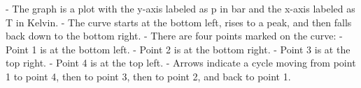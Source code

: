 - The graph is a plot with the y-axis labeled as p in bar and the x-axis labeled as T in Kelvin.
- The curve starts at the bottom left, rises to a peak, and then falls back down to the bottom right.
- There are four points marked on the curve:
  - Point 1 is at the bottom left.
  - Point 2 is at the bottom right.
  - Point 3 is at the top right.
  - Point 4 is at the top left.
- Arrows indicate a cycle moving from point 1 to point 4, then to point 3, then to point 2, and back to point 1.